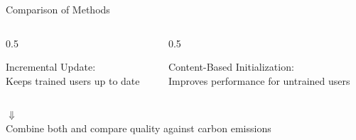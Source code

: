 \begin{frame}{Comparison of Methods}
    \begin{columns}
        \begin{column}{0.5\textwidth}
            \begin{center}
                \Large \textcolor{TUMBlue}{Incremental Update:}\\
                \vspace{3mm}
                \LARGE Keeps trained users up to date
            \end{center}
        \end{column}
        \begin{column}{0.5\textwidth}
            \begin{center}
                \Large \textcolor{TUMBlue}{Content-Based Initialization:}\\
                \vspace{3mm}
                \LARGE Improves performance for untrained users
            \end{center}
        \end{column}
    \end{columns}
    \vspace{3mm}
    \pause
    \begin{center}
        \Huge $\Downarrow$\\
        \vspace{6mm}
        \LARGE Combine both and compare quality against carbon emissions
    \end{center}
\end{frame}
